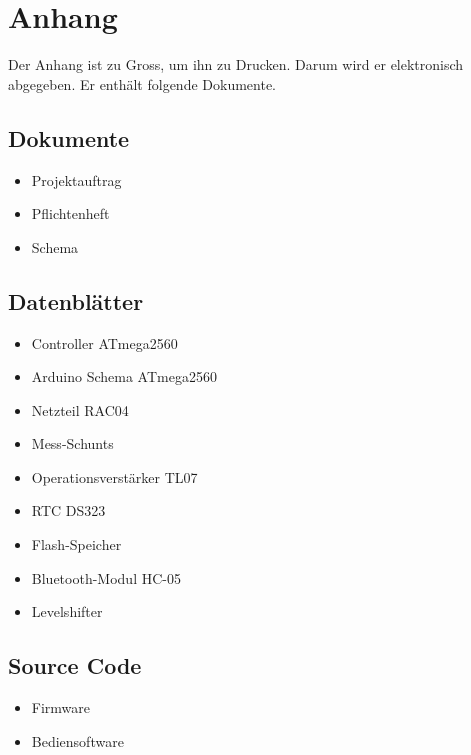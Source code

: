 \pagebreak
\section{Anhang}
Der Anhang ist zu Gross, um ihn zu Drucken. Darum wird er elektronisch abgegeben. Er enthält folgende Dokumente.

\subsection*{Dokumente}
\begin{itemize}
\item Projektauftrag
\item Pflichtenheft
\item Schema
\end{itemize}

\subsection*{Datenblätter}
\begin{itemize}
\item Controller ATmega2560
\item Arduino Schema ATmega2560
\item Netzteil RAC04
\item Mess-Schunts
\item Operationsverstärker TL07
\item RTC DS323
\item Flash-Speicher 
\item Bluetooth-Modul HC-05
\item Levelshifter
\end{itemize}

\subsection*{Source Code}
\begin{itemize}
\item Firmware
\item Bediensoftware
\end{itemize}

